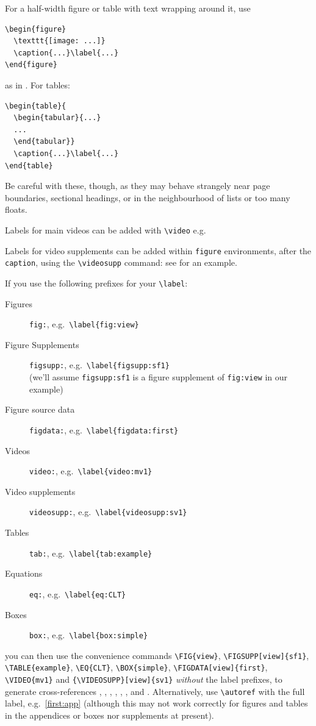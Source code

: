 \documentclass[9pt,lineno]{elife}
\begin{document}
For a half-width figure or table with text wrapping around it, use 

\begin{verbatim}
\begin{figure}
  \texttt{[image: ...]}
  \caption{...}\label{...}
\end{figure}
\end{verbatim}
%
as in . For tables:

\begin{verbatim}
\begin{table}{
  \begin{tabular}{...}
  ...
  \end{tabular}}
  \caption{...}\label{...}
\end{table}
\end{verbatim}

Be careful with these, though, as they may behave strangely near page boundaries, sectional headings, or in the neighbourhood of lists or too many floats.

Labels for main videos can be added with \verb|\video| e.g.

\label{video:mv1}

Labels for video supplements can be added within \texttt{figure} environments, after the \texttt{caption}, using the \verb|\videosupp| command: see  for an example.

If you use the following prefixes for your \verb|\label|:
%
\begin{description}
\item[Figures] \texttt{fig:}, e.g.~\verb|\label{fig:view}|
\item[Figure Supplements] \texttt{figsupp:}, e.g.~\verb|\label{figsupp:sf1}|\\
(we'll assume \texttt{figsupp:sf1} is a figure supplement of \texttt{fig:view} in our example)
\item[Figure source data] \texttt{figdata:}, e.g.~\verb|\label{figdata:first}|
\item[Videos] \texttt{video:}, e.g.~\verb|\label{video:mv1}|
\item[Video supplements] \texttt{videosupp:}, e.g.~\verb|\label{videosupp:sv1}|
\item[Tables] \texttt{tab:}, e.g.~\verb|\label{tab:example}|
\item[Equations] \texttt{eq:}, e.g.~\verb|\label{eq:CLT}|
\item[Boxes] \texttt{box:}, e.g.~\verb|\label{box:simple}|
\end{description}
%
you can then use the convenience commands \verb|\FIG{view}|, \verb|\FIGSUPP[view]{sf1}|, \verb|\TABLE{example}|, \verb|\EQ{CLT}|, \verb|\BOX{simple}|, \verb|\FIGDATA[view]{first}|, \verb|\VIDEO{mv1}| and \verb|{\VIDEOSUPP}[view]{sv1}| \emph{without} the label prefixes, to generate cross-references , ,  , , , ,  and . Alternatively, use \verb|\autoref| with the full label, e.g.~\autoref{first:app} (although this may not work correctly for figures and tables in the appendices or boxes nor supplements at present).
\end{document}
